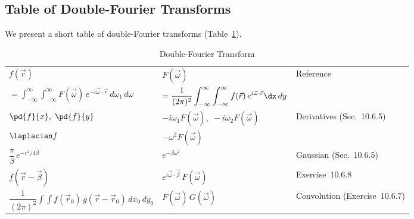 \subsection{Table of Double-Fourier Transforms}
\label{subsec:double-ft-table}

We present a short table of double-Fourier transforms (Table~\ref{tab:double-ft}).

\begin{table}[H]
\centering
\caption{Double-Fourier Transform}
\label{tab:double-ft}
\begin{tabular}{lll}
\toprule
$f(\vec{r})$ & $F(\vec{\omega})$ & Reference \\
$= \displaystyle\int_{-\infty}^{\infty}\int_{-\infty}^{\infty}F(\vec{\omega})\,e^{-i\vec{\omega}\cdot\vec{r}}\,d\omega_1\,d\omega$ & $= \dfrac{1}{(2\pi)^2}\displaystyle\int_{-\infty}^{\infty}\int_{-\infty}^{\infty}f(\vec{r})\,e^{i\vec{\omega}\cdot\vec{r}}\dx\,dy$ & \\
\midrule
$\pd{f}{x},\;\pd{f}{y}$ & $-i\omega_1 F(\vec{\omega}),\;-i\omega_2 F(\vec{\omega})$ & \multirow{2}{*}{Derivatives (Sec.~10.6.5)} \\
$\laplacian f$ & $-\omega^2 F(\vec{\omega})$ & \\[4pt]
$\dfrac{\pi}{\beta}\,e^{-r^2/4\beta}$ & $e^{-\beta\omega^2}$ & Gaussian (Sec.~10.6.5) \\[4pt]
$f(\vec{r}-\vec{\beta})$ & $e^{i\vec{\omega}\cdot\vec{\beta}}\,F(\vec{\omega})$ & Exercise~10.6.8 \\[4pt]
$\dfrac{1}{(2\pi)^2}\displaystyle\int\!\int f(\vec{r}_0)\,g(\vec{r}-\vec{r}_0)\,dx_0\,dy_0$ & $F(\vec{\omega})\,G(\vec{\omega})$ & Convolution (Exercise~10.6.7) \\
\bottomrule
\end{tabular}
\end{table}

